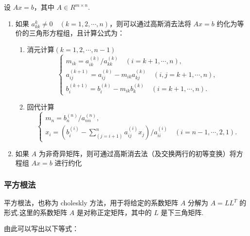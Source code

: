 设 $Ax = b$，其中 $A \in R^{m \times n}$.

\begin{enumerate}
    \item 如果 $a_{kk}^{k} \neq 0\quad(k=1, 2 , \cdots, n)$，则可以通过高斯消去法将 $Ax = b$ 约化为等价的三角形方程组，且计算公式为：
          \begin{enumerate}
              \item 消元计算$(k=1, 2, \cdots, n - 1)$
                    \begin{equation*}
                        \left\{\begin{matrix}
                            m_{ik} = a_{ik}^{(k)} / a_{kk}^{(k)} \quad (i = k + 1, \cdots, n),                  \\
                            a_{ij}^{(k+1)} = a_{ij}^{(k)} - m_{ik}a_{kj}^{(k)} \quad (i, j = k + 1, \cdots, n), \\
                            b_i^{(k+1)} = b_i^{(k)} - m_{ik}b_k^{(k)} \quad (i = k + 1, \cdots, n).
                        \end{matrix}\right.
                    \end{equation*}
              \item 回代计算
                    \begin{equation*}
                        \left\{\begin{matrix}
                            m_n = b_n^{(n)} / a_{nn}^{(n)}, \\
                            x_i = (b_i^{(i)} - \sum_{(j = i + 1)}^n a_{ij}^{(i)}x_j) / a_{ii} ^{(i)} \quad (i = n - 1, \cdots, 2, 1).
                        \end{matrix}\right.
                    \end{equation*}
          \end{enumerate}
    \item 如果 $A$ 为非奇异矩阵，则可通过高斯消去法（及交换两行的初等变换）将方程组 $Ax = b$ 进行约化
\end{enumerate}

\subsubsection{平方根法}

平方根法，也称为 choleskly 方法，用于将给定的系数矩阵 \(A\) 分解为
\(A = L L^T\) 的形式.这里的系数矩阵 \(A\) 是对称正定矩阵，其中的 \(L\)
是下三角矩阵.

由此可以写出以下等式：

